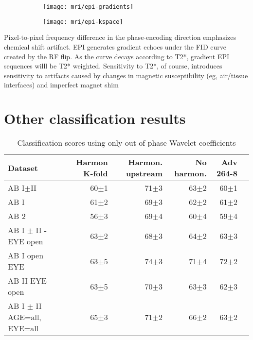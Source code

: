 \documentclass[a4paper,11pt]{article}
\begin{document}
\begin{figure}
\begin{subfigure}{0.5\textwidth}
\texttt{[image: mri/epi-gradients]}
\caption{}
\label{fig:epi-gradients}
\end{subfigure}
\begin{subfigure}{0.5\textwidth}
\texttt{[image: mri/epi-kspace]}
\caption{}
\label{}
\end{subfigure}
\caption{}
\label{fig:epi}
\end{figure}


Pixel-to-pixel frequency difference in the phase-encoding direction emphasizes chemical shift artifact.
EPI generates gradient echoes under the FID curve created by the RF flip. As the curve decays according to T2*, gradient EPI sequences willl be T2* weighted.
Sensitivity to T2*, of course, introduces sensitivity to artifacts caused by changes in magnetic susceptibility (eg, air/tissue interfaces) and imperfect magnet shim

\section{Other classification results}

\begin{table}[!htp]\centering
\scriptsize
\begin{tabular}{lrrrrr}\toprule
Dataset &Harmon K-fold &Harmon. upstream &No harmon. &Adv 264-8 \\\midrule
AB I$\pm$II &60$\pm$1 &71$\pm$3 &63$\pm$2 &60$\pm$1 \\
AB I &61$\pm$2 &69$\pm$3 &62$\pm$2 &61$\pm$2 \\
AB 2 &56$\pm$3 &69$\pm$4 &60$\pm$4 &59$\pm$4 \\
AB I $\pm$ II - EYE open &63$\pm$2 &68$\pm$3 &64$\pm$2 &63$\pm$3 \\
AB I open EYE &63$\pm$5 &74$\pm$3 &71$\pm$4 &72$\pm$2 \\
AB II EYE open &63$\pm$5 &70$\pm$3 &63$\pm$3 &62$\pm$3 \\
AB I $\pm$ II AGE=all, EYE=all &65$\pm$3 &71$\pm$2 &66$\pm$2 &63$\pm$2 \\
\bottomrule
\end{tabular}
\caption{Classification scores using only out-of-phase Wavelet coefficients}
\label{tab:classification_wout}
\end{table}
\end{document}
